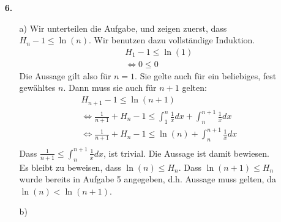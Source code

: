 \documentclass[a4paper,11pt]{article}
\begin{document}
\begin{enumerate}
\begin{enumerate}
            \end{enumerate}


        \item[\textbf{6.}]
            \begin{enumerate}
                \item[a)]
                Wir unterteilen die Aufgabe, und zeigen zuerst, dass $H_n - 1 \leq \ln(n)$. Wir benutzen dazu vollständige Induktion.
                \begin{align*}
                    H_1 - 1 \leq \ln(1)\\
                    \Leftrightarrow 0 \leq 0
                \end{align*}
                Die Aussage gilt also für $n=1$. Sie gelte auch für ein beliebiges, fest gewähltes $n$.
                Dann muss sie auch für $n+1$ gelten:
                \begin{align*}
                    H_{n+1} - 1 \leq \ln(n+1)\\
                    \Leftrightarrow \frac{1}{n+1} + H_n - 1 \leq \int_1^n \frac{1}{x}dx + \int_n^{n+1} \frac{1}{x}dx\\
                    \Leftrightarrow \frac{1}{n+1} + H_n - 1 \leq \ln(n) + \int_n^{n+1} \frac{1}{x}dx\\
                \end{align*}
                Dass $\frac{1}{n+1} \leq \int_n^{n+1} \frac{1}{x}dx$, ist trivial. Die Aussage ist damit bewiesen.\\
                Es bleibt zu beweisen, dass $\ln(n) \leq H_n$. Dass $\ln(n+1) \leq H_n$ wurde bereits in Aufgabe 5 angegeben, d.h.
                Aussage muss gelten, da $\ln(n) < \ln(n+1)$.
                \item[b)]


            \end{enumerate}

    \end{enumerate}
\end{document}
